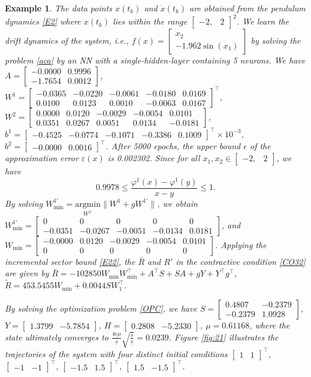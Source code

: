 \documentclass[journal,twoside,web]{ieeecolor}
\newtheorem{example}		[theorem]{Example}
\newcommand{\bbm}[1]{\left[\begin{matrix} #1 \end{matrix}\right]}
\begin{document}
\begin{example}
The data points $x(t_k)$ and $\dot{x}(t_k)$ are obtained from the pendulum dynamics \eqref{E2} where $x(t_k)$ lies within the range $\bbm{-2,&2}^2$. We learn the drift dynamics of the system, i.e., $f(x)=\bbm{x_2\\-1.962\sin(x_1)}$ by solving the problem \eqref{aca} by an NN with a single-hidden-layer containing 5 neurons. We have $A=\bbm{   -0.0000 &   0.9996\\
   -1.7654  &  0.0012}$, $W^1=  \bbm{
-0.0365 &  -0.0220 &   -0.0061  &  -0.0180 &   0.0169\\
    0.0100& 0.0123 &  0.0010 & -0.0063 &   0.0167
}^\top$, $W^2=\bbm{
          0.0000 &   0.0120 &  -0.0029 &  -0.0054 &   0.0101\\
    0.0351 &   0.0267  &  0.0051  &  0.0134  & -0.0181 
}$, $b^1=\bbm{
       -0.4525&
   -0.0774&
   -0.1071&
   -0.3386&
    0.1009
}^\top\times10^{-3}$, $b^2= \bbm{
           -0.0000&
    0.0016
}^{\top}$. After 5000 epochs, the upper bound $\epsilon$ of the approximation error $\varepsilon(x)$ is 0.002302. %
Since for all $x_1,x_2\in\bbm{-2,&2}$, we have
\begin{equation}\label{E22}
0.9978\leq\frac{\varphi^1 (x)-\varphi^1 (y)}{x-y}\leq 1.
\end{equation} 
By solving $W_{\min}^{1'}=\underset{W^{1'}}{\text{argmin}} \|W^1+gW^{1'}\|$, we obtain $W_{\min}^{1'}=\bbm{
     0 &  0 &   0 &  0  &  0\\
    -0.0351 &   -0.0267  &  -0.0051  &  -0.0134  & 0.0181          
}$, and $W_{\min}=\bbm{
      -0.0000  &  0.0120 &  -0.0029  & -0.0054  &  0.0101\\  
   0 & 0 &  0  &  0  & 0       
}$.
Applying the incremental sector bound \eqref{E22}, the $\bar{R}$ and $R'$ in the contractive condition \eqref{CO32} are given by $\bar{R}=-102850W_{\min} W_{\min}^\top+A^\top S+SA+gY+Y^\top g^\top $, $\tilde{R}=453.5455 W_{\min} +0.0044SW_1^{\top}$. 

By solving the optimization problem \eqref{OPC}, we have $S=\bbm{0.4807  & -0.2379
   \\-0.2379  &  1.0928}$, $Y=\bbm{1.3799  & -5.7854}$, $H=\bbm{0.2808 &  -5.2330}$, $\mu=0.61168$, where the state ultimately converges to $\frac{4\epsilon \mu}{\underline{s}}\sqrt{\frac{\overline{s}}{\underline{s}}}=0.0239$. Figure \ref{fig:21} illustrates the trajectories of the system with four distinct initial conditions $\bbm{1&1}^{\top}$, $\bbm{-1&-1}^{\top}$, $\bbm{-1.5&1.5}^{\top}$, $\bbm{1.5&-1.5}^{\top}$. 


\end{example}
\end{document}
